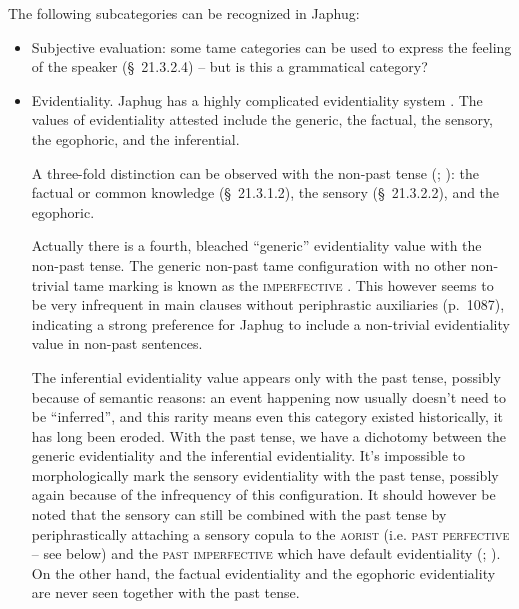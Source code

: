 \documentclass[a4paper, oneside, 12pt]{report}
\newcommand*{\citesec}[1]{\S~{#1}}
\newcommand*{\citetable}[1]{Table~{#1}}
\newcommand*{\citepage}[1]{p.~{#1}}
\newcommand{\category}[1]{\textsc{#1}}
\begin{document}
The following subcategories can be recognized in Japhug: 
\begin{itemize}
    \item Subjective evaluation: some \acs{tame} categories can be used to express 
    the feeling of the speaker (\citesec{21.3.2.4}) -- but is this a grammatical category?
    \item Evidentiality.
    Japhug has a highly complicated evidentiality system 
    \citep[\citetable{31.4}]{jacques2015sketch}.
    The values of evidentiality attested include 
    the generic, the factual, the sensory, the egophoric, and the inferential.

    A three-fold distinction can be observed with the non-past tense
    (\citealt[\citesec{21.3.4}]{jacques2021grammar}; 
    \citealt[\citepage{517}]{jacques2019egophoric}): 
    the factual or common knowledge (\citesec{21.3.1.2}), 
    the sensory (\citesec{21.3.2.2}),
    and the egophoric.

    Actually there is a fourth, bleached ``generic'' evidentiality value 
    with the non-past tense.
    The generic non-past \acs{tame} configuration 
    with no other non-trivial \acs{tame} marking 
    is known as the \category{imperfective} \citep[\citesec{21.2}]{jacques2021grammar}.
    This however seems to be very infrequent in main clauses
    without periphrastic auxiliaries (\citepage{1087}),
    indicating a strong preference for Japhug 
    to include a non-trivial evidentiality value in non-past sentences.
    
    The inferential evidentiality value appears only with the past tense,
    possibly because of semantic reasons: 
    an event happening now usually doesn't need to be ``inferred'',
    and this rarity means even this category existed historically,
    it has long been eroded.
    With the past tense, 
    we have a dichotomy between the generic evidentiality and the inferential evidentiality.
    It's impossible to morphologically mark the sensory evidentiality
    with the past tense, 
    possibly again because of the infrequency of this configuration.  
    It should however be noted that 
    the sensory can still be combined with the past tense 
    by periphrastically attaching a sensory copula 
    to the \category{aorist} (i.e. \category{past perfective} -- see below) 
    and the \category{past imperfective}
    which have default evidentiality
    (\citealt[\citesec{21.5.1.8}, \citesec{21.5.3.5}]{jacques2021grammar}; 
    \citealt[\citepage{518}]{jacques2019egophoric}). 
    On the other hand, the factual evidentiality and the egophoric evidentiality
    are never seen together with the past tense.


\end{itemize}
\end{document}
